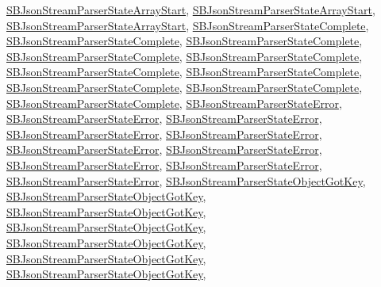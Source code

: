 \hyperlink{interface_s_b_json_stream_parser_state_array_start}{\-S\-B\-Json\-Stream\-Parser\-State\-Array\-Start}, \hyperlink{interface_s_b_json_stream_parser_state_array_start}{\-S\-B\-Json\-Stream\-Parser\-State\-Array\-Start}, \hyperlink{interface_s_b_json_stream_parser_state_array_start}{\-S\-B\-Json\-Stream\-Parser\-State\-Array\-Start}, \hyperlink{interface_s_b_json_stream_parser_state_complete}{\-S\-B\-Json\-Stream\-Parser\-State\-Complete}, \hyperlink{interface_s_b_json_stream_parser_state_complete}{\-S\-B\-Json\-Stream\-Parser\-State\-Complete}, \hyperlink{interface_s_b_json_stream_parser_state_complete}{\-S\-B\-Json\-Stream\-Parser\-State\-Complete}, \hyperlink{interface_s_b_json_stream_parser_state_complete}{\-S\-B\-Json\-Stream\-Parser\-State\-Complete}, \hyperlink{interface_s_b_json_stream_parser_state_complete}{\-S\-B\-Json\-Stream\-Parser\-State\-Complete}, \hyperlink{interface_s_b_json_stream_parser_state_complete}{\-S\-B\-Json\-Stream\-Parser\-State\-Complete}, \hyperlink{interface_s_b_json_stream_parser_state_complete}{\-S\-B\-Json\-Stream\-Parser\-State\-Complete}, \hyperlink{interface_s_b_json_stream_parser_state_complete}{\-S\-B\-Json\-Stream\-Parser\-State\-Complete}, \hyperlink{interface_s_b_json_stream_parser_state_complete}{\-S\-B\-Json\-Stream\-Parser\-State\-Complete}, \hyperlink{interface_s_b_json_stream_parser_state_complete}{\-S\-B\-Json\-Stream\-Parser\-State\-Complete}, \hyperlink{interface_s_b_json_stream_parser_state_error}{\-S\-B\-Json\-Stream\-Parser\-State\-Error}, \hyperlink{interface_s_b_json_stream_parser_state_error}{\-S\-B\-Json\-Stream\-Parser\-State\-Error}, \hyperlink{interface_s_b_json_stream_parser_state_error}{\-S\-B\-Json\-Stream\-Parser\-State\-Error}, \hyperlink{interface_s_b_json_stream_parser_state_error}{\-S\-B\-Json\-Stream\-Parser\-State\-Error}, \hyperlink{interface_s_b_json_stream_parser_state_error}{\-S\-B\-Json\-Stream\-Parser\-State\-Error}, \hyperlink{interface_s_b_json_stream_parser_state_error}{\-S\-B\-Json\-Stream\-Parser\-State\-Error}, \hyperlink{interface_s_b_json_stream_parser_state_error}{\-S\-B\-Json\-Stream\-Parser\-State\-Error}, \hyperlink{interface_s_b_json_stream_parser_state_error}{\-S\-B\-Json\-Stream\-Parser\-State\-Error}, \hyperlink{interface_s_b_json_stream_parser_state_error}{\-S\-B\-Json\-Stream\-Parser\-State\-Error}, \hyperlink{interface_s_b_json_stream_parser_state_error}{\-S\-B\-Json\-Stream\-Parser\-State\-Error}, \hyperlink{interface_s_b_json_stream_parser_state_object_got_key}{\-S\-B\-Json\-Stream\-Parser\-State\-Object\-Got\-Key}, \hyperlink{interface_s_b_json_stream_parser_state_object_got_key}{\-S\-B\-Json\-Stream\-Parser\-State\-Object\-Got\-Key}, \hyperlink{interface_s_b_json_stream_parser_state_object_got_key}{\-S\-B\-Json\-Stream\-Parser\-State\-Object\-Got\-Key}, \hyperlink{interface_s_b_json_stream_parser_state_object_got_key}{\-S\-B\-Json\-Stream\-Parser\-State\-Object\-Got\-Key}, \hyperlink{interface_s_b_json_stream_parser_state_object_got_key}{\-S\-B\-Json\-Stream\-Parser\-State\-Object\-Got\-Key}, \hyperlink{interface_s_b_json_stream_parser_state_object_got_key}{\-S\-B\-Json\-Stream\-Parser\-State\-Object\-Got\-Key}, \hyperlink{interface_s_b_json_stream_parser_state_object_got_key}{\-S\-B\-Json\-Stream\-Parser\-State\-Object\-Got\-Key}, 